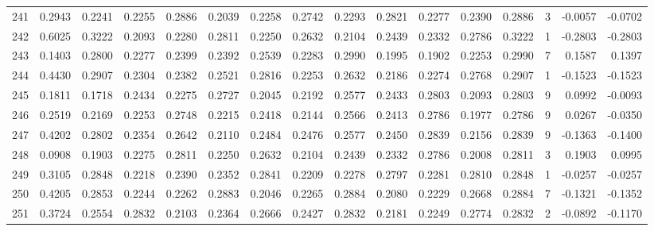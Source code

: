 \begin{tabular}{lrrrrrrrrrrrrrrr}
241 &      0.2943 &  0.2241 &  0.2255 &  0.2886 &  0.2039 &  0.2258 &  0.2742 &  0.2293 &  0.2821 &  0.2277 &   0.2390 &     0.2886 &      3 &                   -0.0057 &                    -0.0702 \\
242 &      0.6025 &  0.3222 &  0.2093 &  0.2280 &  0.2811 &  0.2250 &  0.2632 &  0.2104 &  0.2439 &  0.2332 &   0.2786 &     0.3222 &      1 &                   -0.2803 &                    -0.2803 \\
243 &      0.1403 &  0.2800 &  0.2277 &  0.2399 &  0.2392 &  0.2539 &  0.2283 &  0.2990 &  0.1995 &  0.1902 &   0.2253 &     0.2990 &      7 &                    0.1587 &                     0.1397 \\
244 &      0.4430 &  0.2907 &  0.2304 &  0.2382 &  0.2521 &  0.2816 &  0.2253 &  0.2632 &  0.2186 &  0.2274 &   0.2768 &     0.2907 &      1 &                   -0.1523 &                    -0.1523 \\
245 &      0.1811 &  0.1718 &  0.2434 &  0.2275 &  0.2727 &  0.2045 &  0.2192 &  0.2577 &  0.2433 &  0.2803 &   0.2093 &     0.2803 &      9 &                    0.0992 &                    -0.0093 \\
246 &      0.2519 &  0.2169 &  0.2253 &  0.2748 &  0.2215 &  0.2418 &  0.2144 &  0.2566 &  0.2413 &  0.2786 &   0.1977 &     0.2786 &      9 &                    0.0267 &                    -0.0350 \\
247 &      0.4202 &  0.2802 &  0.2354 &  0.2642 &  0.2110 &  0.2484 &  0.2476 &  0.2577 &  0.2450 &  0.2839 &   0.2156 &     0.2839 &      9 &                   -0.1363 &                    -0.1400 \\
248 &      0.0908 &  0.1903 &  0.2275 &  0.2811 &  0.2250 &  0.2632 &  0.2104 &  0.2439 &  0.2332 &  0.2786 &   0.2008 &     0.2811 &      3 &                    0.1903 &                     0.0995 \\
249 &      0.3105 &  0.2848 &  0.2218 &  0.2390 &  0.2352 &  0.2841 &  0.2209 &  0.2278 &  0.2797 &  0.2281 &   0.2810 &     0.2848 &      1 &                   -0.0257 &                    -0.0257 \\
250 &      0.4205 &  0.2853 &  0.2244 &  0.2262 &  0.2883 &  0.2046 &  0.2265 &  0.2884 &  0.2080 &  0.2229 &   0.2668 &     0.2884 &      7 &                   -0.1321 &                    -0.1352 \\
251 &      0.3724 &  0.2554 &  0.2832 &  0.2103 &  0.2364 &  0.2666 &  0.2427 &  0.2832 &  0.2181 &  0.2249 &   0.2774 &     0.2832 &      2 &                   -0.0892 &                    -0.1170 \\

\end{tabular}

